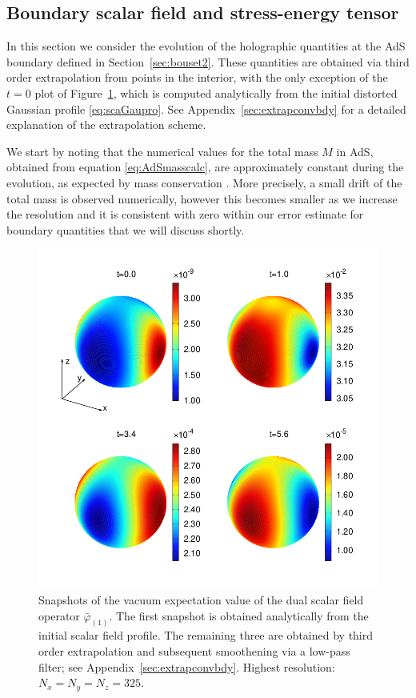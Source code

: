 \documentclass[a4paper,11pt]{article}
\numberwithin{equation}{section}
\begin{document}
\subsection{Boundary scalar field and stress-energy tensor}
\label{sec:resbouset}

In this section we consider the evolution of the holographic quantities at the AdS boundary defined in Section~\ref{sec:bouset2}. 
These quantities are obtained via third order extrapolation from points in the interior, with the only exception of the $t=0$ plot of Figure~\ref{fig:snapshotsbdyphi}, which is computed analytically from the initial distorted Gaussian profile \eqref{eq:scaGaupro}. 
See Appendix~\ref{sec:extrapconvbdy} for a detailed explanation of the extrapolation scheme.

We start by noting that the numerical values for the total mass $M$ in AdS, obtained from equation \eqref{eq:AdSmasscalc}, are approximately constant during the evolution, as expected by mass conservation \cite{Fischetti:2012rd}. More precisely, a small drift of the total mass is observed numerically, however this becomes smaller as we increase the resolution and it is consistent with zero within our error estimate for boundary quantities that we will discuss shortly.

\begin{figure}[!h]
        \centering
        \includegraphics[width=5.0in,clip=true]{plots/bdyplots/L3/bdyphi/sphereplots_bdyphi_L3_2by2.png}
\parbox{5.0in}{\caption{
Snapshots of the vacuum expectation value of the dual scalar field operator $\bar{\varphi}_{(1)}$. 
The first snapshot is obtained analytically from the initial scalar field profile. The remaining three are obtained by third order extrapolation and subsequent smoothening via a low-pass filter;
see Appendix~\ref{sec:extrapconvbdy}. Highest resolution: $N_x=N_y=N_z=325$.
        }\label{fig:snapshotsbdyphi}}
\end{figure}
\end{document}
